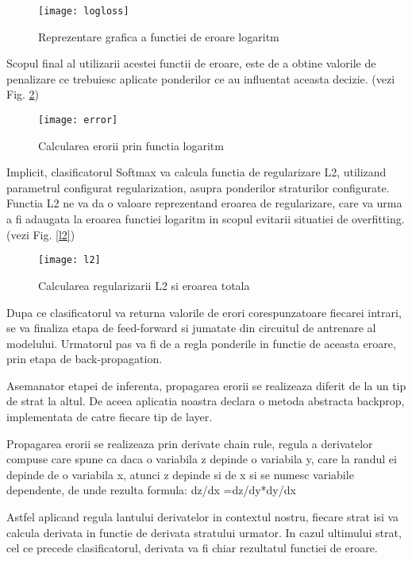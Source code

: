 	\vfill
	
	\begin{figure}[H]
		\texttt{[image: logloss]}
		\caption{\label{fig:logloss} Reprezentare grafica a functiei de eroare logaritm}
	\end{figure}


	Scopul final al utilizarii acestei functii de eroare, este de a obtine valorile de penalizare ce trebuiesc aplicate ponderilor ce au influentat aceasta decizie. (vezi Fig. \ref{fig:error})
	
	\begin{figure}[H]
		\texttt{[image: error]}
		\caption{\label{fig:error} Calcularea erorii prin functia logaritm}
	\end{figure}

	
	Implicit, clasificatorul Softmax va calcula functia de regularizare L2, utilizand parametrul configurat regularization, asupra ponderilor straturilor configurate. Functia L2 ne va da o valoare reprezentand eroarea de regularizare, care va urma a fi adaugata la eroarea functiei logaritm in scopul evitarii situatiei de overfitting. (vezi Fig. \ref{l2})


	\begin{figure}[H]
		\texttt{[image: l2]}
		\caption{\label{fig:l2} Calcularea regularizarii L2 si eroarea totala}
	\end{figure}

	Dupa ce clasificatorul va returna valorile de erori corespunzatoare fiecarei intrari, se va finaliza etapa de feed-forward si jumatate din circuitul de antrenare al modelului. Urmatorul pas va fi de a regla ponderile in functie de aceasta eroare, prin etapa de back-propagation.
	 
	Asemanator etapei de inferenta, propagarea erorii se realizeaza diferit de la un tip de strat la altul. De aceea aplicatia noastra declara o metoda abstracta backprop, implementata de catre fiecare tip de layer.
	
	Propagarea erorii se realizeaza prin derivate chain rule, regula a derivatelor compuse care spune ca daca o variabila z depinde o variabila y, care la randul ei depinde de o variabila x, atunci z depinde si de x si se numesc variabile dependente, de unde rezulta formula:  dz/dx  =dz/dy*dy/dx
	
	Astfel aplicand regula lantului derivatelor in contextul nostru, fiecare strat isi va calcula derivata in functie de derivata stratului urmator. In cazul ultimului strat, cel ce precede clasificatorul, derivata va fi chiar rezultatul functiei de eroare.
	
